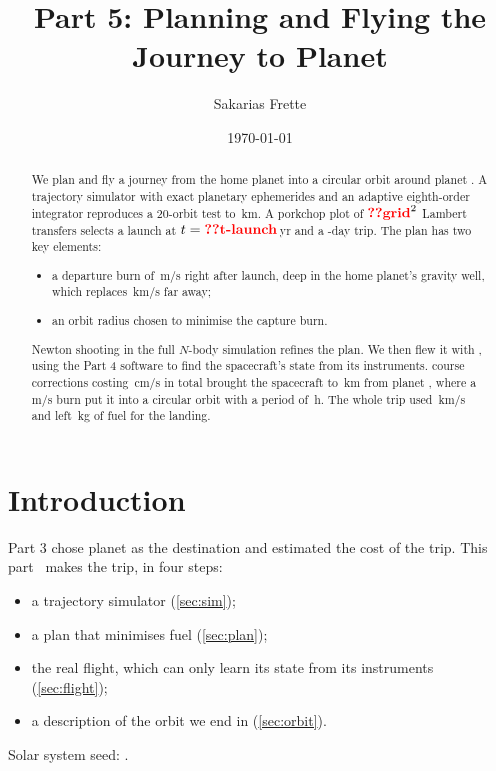 \documentclass[aps,prd,twocolumn,nofootinbib,floatfix,superscriptaddress]{revtex4-2}
\begin{document}
\title{Part 5: Planning and Flying the Journey to Planet }
\author{Sakarias Frette}
\date{\today}

\begin{abstract}
We plan and fly a journey from the home planet into a circular orbit around planet .
A trajectory simulator with exact planetary ephemerides and an adaptive eighth-order integrator reproduces a 20-orbit test to \,km.
A porkchop plot of $\val{grid}^2$ Lambert transfers selects a launch at $t=\val{t-launch}$\,yr and a -day trip.
The plan has two key elements:
\begin{itemize}
\item a departure burn of \,m/s right after launch, deep in the home planet's gravity well, which replaces \,km/s far away;
\item an orbit radius chosen to minimise the capture burn.
\end{itemize}
Newton shooting in the full $N$-body simulation refines the plan.
We then flew it with , using the Part 4 software to find the spacecraft's state from its instruments.
 course corrections costing \,cm/s in total brought the spacecraft to \,km from planet , where a \,m/s burn put it into a circular orbit with a period of \,h.
The whole trip used \,km/s and left \,kg of fuel for the landing.
\end{abstract}

\maketitle

\section{Introduction}
Part 3 chose planet  as the destination and estimated the cost of the trip.
This part~\cite{ast2000project} makes the trip, in four steps:
\begin{itemize}
\item a trajectory simulator (\cref{sec:sim});
\item a plan that minimises fuel (\cref{sec:plan});
\item the real flight, which can only learn its state from its instruments (\cref{sec:flight});
\item a description of the orbit we end in (\cref{sec:orbit}).
\end{itemize}
Solar system seed: .
\end{document}
